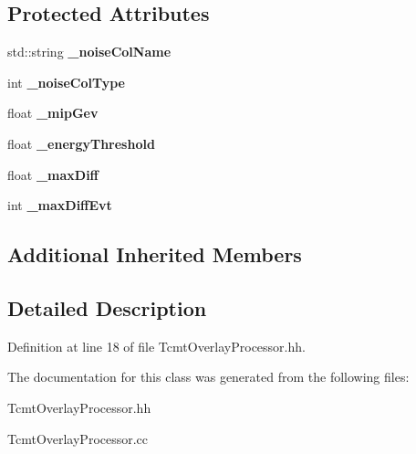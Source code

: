 \subsection*{Protected Attributes}
\begin{DoxyCompactItemize}
\item 
std\-::string {\bfseries \-\_\-noise\-Col\-Name}\label{classCALICE_1_1TcmtOverlayProcessor_ae5a9f82b50886731200994d68dd96909}

\item 
int {\bfseries \-\_\-noise\-Col\-Type}\label{classCALICE_1_1TcmtOverlayProcessor_aa618736308ff49da01203210481bd9be}

\item 
float {\bfseries \-\_\-mip\-Gev}\label{classCALICE_1_1TcmtOverlayProcessor_a9a4eb5151f1d1f92e91d40e6a3a1c4bb}

\item 
float {\bfseries \-\_\-energy\-Threshold}\label{classCALICE_1_1TcmtOverlayProcessor_ad34887a6904dc0accc0b84c810a175d7}

\item 
float {\bfseries \-\_\-max\-Diff}\label{classCALICE_1_1TcmtOverlayProcessor_a4f6d55ec0342e5cd5576f5ecbc8b905c}

\item 
int {\bfseries \-\_\-max\-Diff\-Evt}\label{classCALICE_1_1TcmtOverlayProcessor_ae90c13dd293d0acecd224d9e65a5737d}

\end{DoxyCompactItemize}
\subsection*{Additional Inherited Members}


\subsection{Detailed Description}


Definition at line 18 of file Tcmt\-Overlay\-Processor.\-hh.



The documentation for this class was generated from the following files\-:\begin{DoxyCompactItemize}
\item 
Tcmt\-Overlay\-Processor.\-hh\item 
Tcmt\-Overlay\-Processor.\-cc\end{DoxyCompactItemize}
